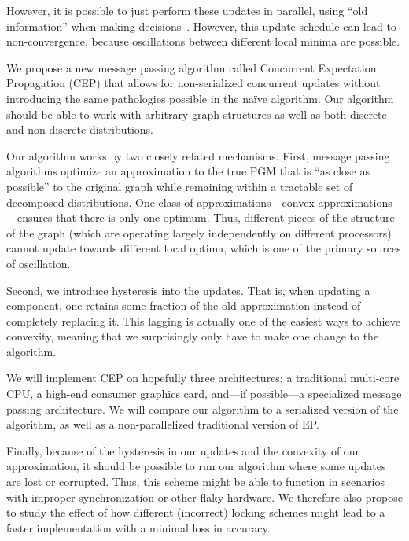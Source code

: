 \documentclass[12pt,leqno,twoside]{article}
\begin{document}
However, it is possible to just perform these updates in parallel,
using ``old information'' when making decisions~\citep{CsekeHeskes2010}.
However, this update schedule can lead to non-convergence, because
oscillations between different local minima are possible.

\begin{comment}
Consider a probability distribution over two binary variables $x_1$ and $x_2$
that have a distribution as in Figure 1. Suppose When updating sequentially,
the algorithm will converge quickly, with $x_1$ updating to the opposite of
$x_2$'s value. However, if the updates are performed in parallel, the 
system could potentially oscillate, never
\end{comment}

We propose a new message passing algorithm called Concurrent
Expectation Propagation (CEP) that allows for non-serialized
concurrent updates without introducing the same pathologies possible
in the na\"ive algorithm. Our algorithm should be able to work with
arbitrary graph structures as well as both discrete and non-discrete
distributions.

Our algorithm works by two closely related mechanisms. First, message
passing algorithms optimize an approximation to the true PGM that
is ``as close as possible'' to the original graph while remaining
within a tractable set of decomposed distributions. One class of
approximations---convex approximations---ensures that there is
only one optimum. Thus, different pieces of the structure of the
graph (which are operating largely independently on different
processors) cannot update towards different local optima, which is
one of the primary sources of oscillation.

Second, we introduce hysteresis into the updates. That is, when
updating a component, one retains some fraction of the old approximation
instead of completely replacing it. This lagging is actually one of 
the easiest ways to achieve convexity, meaning that
we surprisingly only have to make one change to the algorithm.

We will implement CEP on hopefully three architectures: a traditional multi-core
CPU, a high-end consumer graphics card, and---if possible---a
specialized message passing architecture. We will compare our
algorithm to a serialized version of the algorithm, as well as a
non-parallelized traditional version of EP.

Finally, because of the hysteresis in our updates and the convexity
of our approximation, it should be possible to run our algorithm
where some updates are lost or corrupted. Thus, this scheme might
be able to function in scenarios with improper synchronization or
other flaky hardware. We therefore also propose to study
the effect of how different (incorrect) locking schemes
might lead to a faster implementation with a minimal loss in accuracy.
\end{document}

